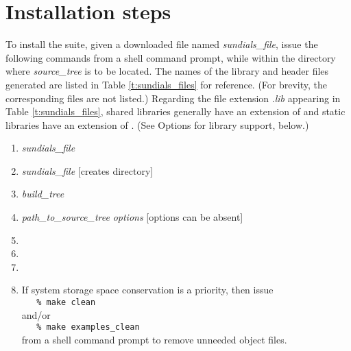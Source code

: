 \section{Installation steps}\label{ss:install_steps}

To install the {\sundials} suite, given a downloaded file named
{\em sundials\_file}, issue the following commands from
a shell command prompt, while within the directory where {\em source\_tree}
is to be located.  The names of the library and header files
generated are listed in Table \ref{t:sundials_files} for reference.  (For brevity,
the corresponding  files are not listed.)  Regarding the file
extension .{\em lib} appearing in Table \ref{t:sundials_files}, shared libraries
generally have an extension of  and static libraries have an extension of
.  (See Options for library support, below.)
\begin{enumerate}
\item {} {\em sundials\_file}
\item {} {\em sundials\_file}\hspace{2em} [creates  directory]
\item {} {\em build\_tree}
\item {\em path\_to\_source\_tree} {\em options}\hspace{2em} [options can be absent]
\item {}
\item {}
\item {}
\item If system storage space conservation is a priority, then issue \\
\verb+   % make clean+ \\
and/or \\
\verb+   % make examples_clean+ \\
from a shell command prompt to remove unneeded object files.
\end{enumerate}

